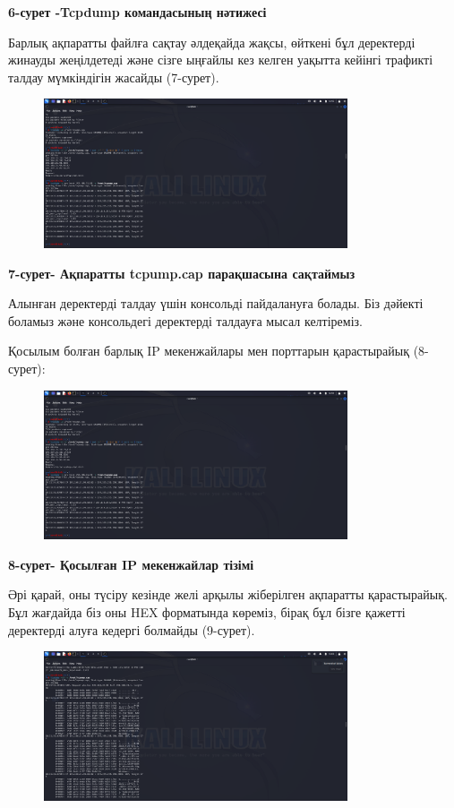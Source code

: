 {\bfseries 6-сурет -Tcpdump командасының нәтижесі}

Барлық ақпаратты файлға сақтау әлдеқайда жақсы, өйткені бұл деректерді
жинауды жеңілдетеді және сізге ыңғайлы кез келген уақытта кейінгі
трафикті талдау мүмкіндігін жасайды (7-сурет).

\begin{figure}[H]
	\centering
	\includegraphics[width=0.8\textwidth]{assets/31}
	\caption*{}
\end{figure}

{\bfseries 7-сурет- Ақпаратты tcpump.cap парақшасына сақтаймыз}

Алынған деректерді талдау үшін консольді пайдалануға болады. Біз дәйекті
боламыз және консольдегі деректерді талдауға мысал келтіреміз.

Қосылым болған барлық IP мекенжайлары мен порттарын қарастырайық
(8-сурет):

\begin{figure}[H]
	\centering
	\includegraphics[width=0.8\textwidth]{assets/32}
	\caption*{}
\end{figure}

{\bfseries 8-сурет- Қосылған IP мекенжайлар тізімі}

Әрі қарай, оны түсіру кезінде желі арқылы жіберілген ақпаратты
қарастырайық. Бұл жағдайда біз оны HEX форматында көреміз, бірақ бұл
бізге қажетті деректерді алуға кедергі болмайды (9-сурет).

\begin{figure}[H]
	\centering
	\includegraphics[width=0.8\textwidth]{assets/33}
	\caption*{}
\end{figure}

